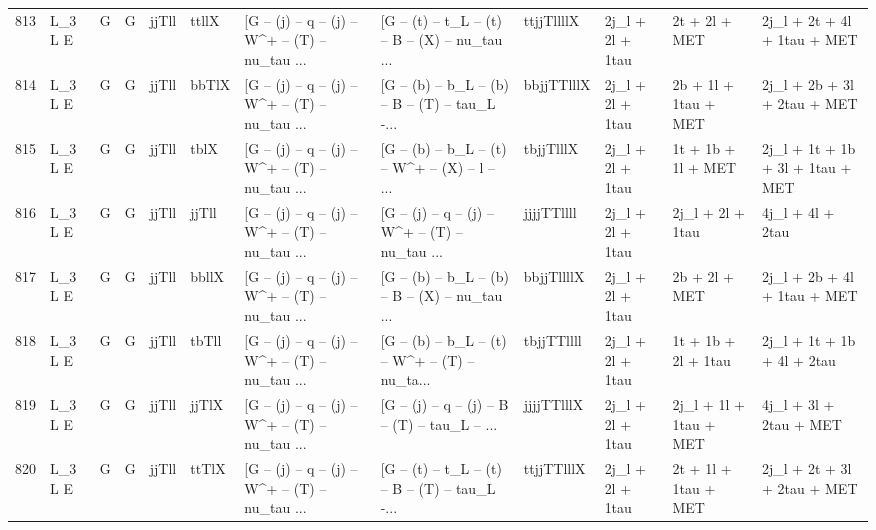 \begin{tabular}{llllllllllll}
813  &      L\_3 L E &     G &     G &       jjTll &       ttllX &  [G -- (j) -- q -- (j) -- W\textasciicircum + -- (T) -- nu\_tau ... &  [G -- (t) -- t\_L -- (t) -- B -- (X) -- nu\_tau ... &  ttjjTllllX &         2j\_l + 2l + 1tau &            2t + 2l + MET &        2j\_l + 2t + 4l + 1tau + MET \\
814  &      L\_3 L E &     G &     G &       jjTll &       bbTlX &  [G -- (j) -- q -- (j) -- W\textasciicircum + -- (T) -- nu\_tau ... &  [G -- (b) -- b\_L -- (b) -- B -- (T) -- tau\_L -... &  bbjjTTlllX &         2j\_l + 2l + 1tau &     2b + 1l + 1tau + MET &        2j\_l + 2b + 3l + 2tau + MET \\
815  &      L\_3 L E &     G &     G &       jjTll &        tblX &  [G -- (j) -- q -- (j) -- W\textasciicircum + -- (T) -- nu\_tau ... &  [G -- (b) -- b\_L -- (t) -- W\textasciicircum + -- (X) -- l -- ... &   tbjjTlllX &         2j\_l + 2l + 1tau &       1t + 1b + 1l + MET &   2j\_l + 1t + 1b + 3l + 1tau + MET \\
816  &      L\_3 L E &     G &     G &       jjTll &       jjTll &  [G -- (j) -- q -- (j) -- W\textasciicircum + -- (T) -- nu\_tau ... &  [G -- (j) -- q -- (j) -- W\textasciicircum + -- (T) -- nu\_tau ... &  jjjjTTllll &         2j\_l + 2l + 1tau &         2j\_l + 2l + 1tau &                   4j\_l + 4l + 2tau \\
817  &      L\_3 L E &     G &     G &       jjTll &       bbllX &  [G -- (j) -- q -- (j) -- W\textasciicircum + -- (T) -- nu\_tau ... &  [G -- (b) -- b\_L -- (b) -- B -- (X) -- nu\_tau ... &  bbjjTllllX &         2j\_l + 2l + 1tau &            2b + 2l + MET &        2j\_l + 2b + 4l + 1tau + MET \\
818  &      L\_3 L E &     G &     G &       jjTll &       tbTll &  [G -- (j) -- q -- (j) -- W\textasciicircum + -- (T) -- nu\_tau ... &  [G -- (b) -- b\_L -- (t) -- W\textasciicircum + -- (T) -- nu\_ta... &  tbjjTTllll &         2j\_l + 2l + 1tau &      1t + 1b + 2l + 1tau &         2j\_l + 1t + 1b + 4l + 2tau \\
819  &      L\_3 L E &     G &     G &       jjTll &       jjTlX &  [G -- (j) -- q -- (j) -- W\textasciicircum + -- (T) -- nu\_tau ... &  [G -- (j) -- q -- (j) -- B -- (T) -- tau\_L -- ... &  jjjjTTlllX &         2j\_l + 2l + 1tau &   2j\_l + 1l + 1tau + MET &             4j\_l + 3l + 2tau + MET \\
820  &      L\_3 L E &     G &     G &       jjTll &       ttTlX &  [G -- (j) -- q -- (j) -- W\textasciicircum + -- (T) -- nu\_tau ... &  [G -- (t) -- t\_L -- (t) -- B -- (T) -- tau\_L -... &  ttjjTTlllX &         2j\_l + 2l + 1tau &     2t + 1l + 1tau + MET &        2j\_l + 2t + 3l + 2tau + MET \\

\end{tabular}
